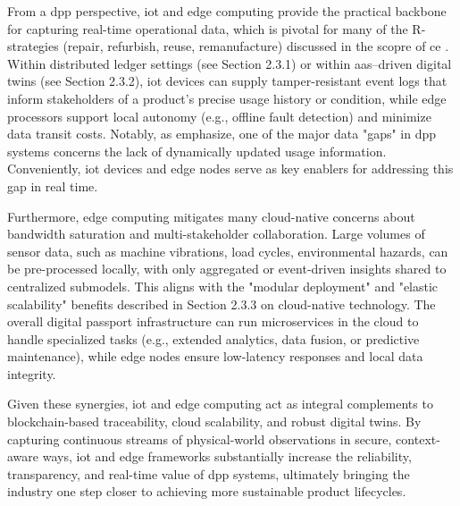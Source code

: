 From a \ac{dpp} perspective, \ac{iot} and edge computing provide the practical backbone for capturing real-time operational data, which is pivotal for many of the R-strategies (repair, refurbish, reuse, remanufacture) discussed in the scopre of \ac{ce} \autocite{DeutschesInstitutfurNormunge.V..2023}. Within distributed ledger settings (see Section 2.3.1) or within \ac{aas}–driven digital twins (see Section 2.3.2), \ac{iot} devices can supply tamper-resistant event logs that inform stakeholders of a product’s precise usage history or condition, while edge processors support local autonomy (e.g., offline fault detection) and minimize data transit costs. Notably, as \textcite{Kuhn.2025} emphasize, one of the major data "gaps" in \ac{dpp} systems concerns the lack of dynamically updated usage information. Conveniently, \ac{iot} devices and edge nodes serve as key enablers for addressing this gap in real time.

Furthermore, edge computing mitigates many cloud-native concerns about bandwidth saturation and multi-stakeholder collaboration. Large volumes of sensor data, such as machine vibrations, load cycles, environmental hazards, can be pre-processed locally, with only aggregated or event-driven insights shared to centralized submodels. This aligns with the "modular deployment" and "elastic scalability" benefits described in Section 2.3.3 on cloud-native technology. The overall digital passport infrastructure can run microservices in the cloud to handle specialized tasks (e.g., extended analytics, data fusion, or predictive maintenance), while edge nodes ensure low-latency responses and local data integrity. \autocite{Shi.2016, Burns.2016}

Given these synergies, \ac{iot} and edge computing act as integral complements to blockchain-based traceability, cloud scalability, and robust digital twins. By capturing continuous streams of physical-world observations in secure, context-aware ways, \ac{iot} and edge frameworks substantially increase the reliability, transparency, and real-time value of \ac{dpp} systems, ultimately bringing the industry one step closer to achieving more sustainable product lifecycles.

